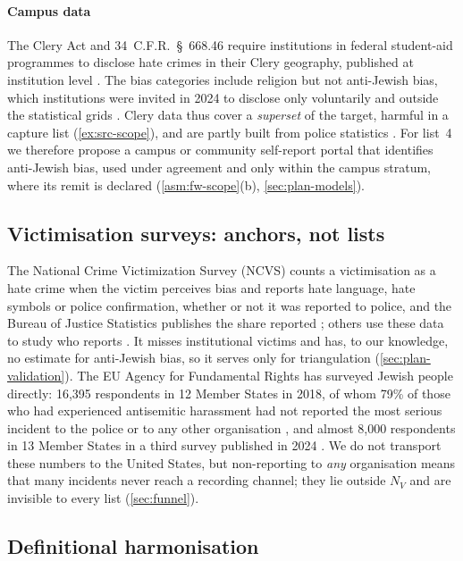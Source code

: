 \paragraph{Campus data}\label{sec:src-campus}
The Clery Act \citep{cleryact} and 34~C.F.R.\ \S~668.46 \citep{ecfr668} require institutions in federal student-aid programmes to disclose hate crimes in their Clery geography, published at institution level \citep{edcss}. The bias categories include religion but not anti-Jewish bias, which institutions were invited in 2024 to disclose only voluntarily and outside the statistical grids \citep{ed2024subcat}. Clery data thus cover a \emph{superset} of the target, harmful in a capture list (\cref{ex:src-scope}), and are partly built from police statistics \citep{ecfr668}. For list~4 we therefore propose a campus or community self-report portal that identifies anti-Jewish bias, used under agreement and only within the campus stratum, where its remit is declared (\cref{asm:fw-scope}(b), \cref{sec:plan-models}).

\subsection{Victimisation surveys: anchors, not lists}\label{sec:src-surveys}

The National Crime Victimization Survey (NCVS) counts a victimisation as a hate crime when the victim perceives bias and reports hate language, hate symbols or police confirmation, whether or not it was reported to police, and the Bureau of Justice Statistics publishes the share reported \citep{bjs2021hate}; others use these data to study who reports \citep{zaykowski2010,lantz2022,pezzella2019}. It misses institutional victims and has, to our knowledge, no estimate for anti-Jewish bias, so it serves only for triangulation (\cref{sec:plan-validation}). The EU Agency for Fundamental Rights has surveyed Jewish people directly: 16{,}395 respondents in 12 Member States in 2018, of whom 79\% of those who had experienced antisemitic harassment had not reported the most serious incident to the police or to any other organisation \citep{fra2018antisemitism}, and almost 8{,}000 respondents in 13 Member States in a third survey published in 2024 \citep{fra2024antisemitism}. We do not transport these numbers to the United States, but non-reporting to \emph{any} organisation means that many incidents never reach a recording channel; they lie outside $N_V$ and are invisible to every list (\cref{sec:funnel}).

\subsection{Definitional harmonisation}\label{sec:src-harmonise}

